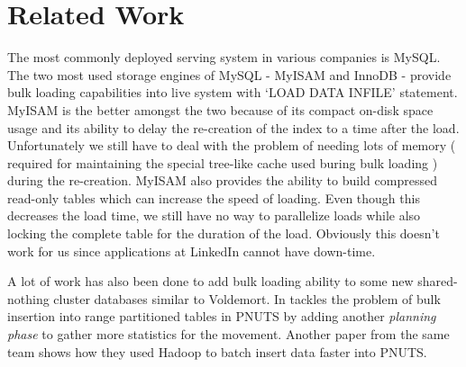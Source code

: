 \documentclass[10pt,twocolumn,preprint,natbib,authoryear]{sigplanconf}
\begin{document}
\section{Related Work}
\label{sec:related_work}
The most commonly deployed serving system in various companies is MySQL. The two most used storage engines of MySQL - MyISAM and InnoDB - provide bulk loading capabilities into live system with `LOAD DATA INFILE' statement. MyISAM is the better amongst the two because of its compact on-disk space usage and its ability to delay the re-creation of the index to a time after the load\cite{6 - http://dev.mysql.com/doc/refman/5.5/en/optimizing-myisam-bulk-data-loading.html}.  Unfortunately we still have to deal with the problem of needing lots of memory ( required for maintaining the special tree-like cache used buring bulk loading \cite{http://dev.mysql.com/doc/refman/5.1/en/server-system-variables.html-sysvar_bulk_insert_buffer_size}) during the re-creation. MyISAM also provides the ability to build compressed read-only tables \cite{7 - http://dev.mysql.com/doc/refman/5.5/en/myisampack.html} which can increase the speed of loading. Even though this decreases the load time, we still have no way to parallelize loads while also locking the complete table for the duration of the load. Obviously this doesn't work for us since applications at LinkedIn cannot have down-time. 

A lot of work has also been done to add bulk loading ability to some new shared-nothing cluster\cite{The Case for Shared Nothing Database} databases similar to Voldemort. In \cite{8 - Efﬁcient Bulk Insertion into a Distributed Ordered Table} tackles the problem of bulk insertion into range partitioned tables in PNUTS \cite{9 - PNUTS paper} by adding another \emph {planning phase} to gather more statistics for the movement. Another paper from the same team \cite{A Batch of PNUTS: Experiences Connecting Cloud Batch and Serving Systems} shows how they used Hadoop to batch insert data faster into PNUTS.
\end{document}
